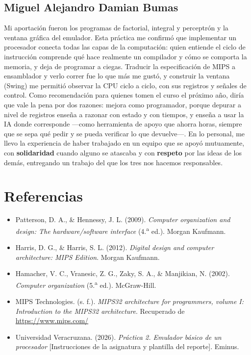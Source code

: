 \documentclass[11pt,letterpaper,oneside]{article}
\begin{document}
\subsection{Miguel Alejandro Damian Bumas}

Mi aportación fueron los programas de factorial, integral y perceptrón y la
ventana gráfica del emulador. Esta práctica me confirmó que implementar un
procesador conecta todas las capas de la computación: quien entiende el ciclo
de instrucción comprende qué hace realmente un compilador y cómo se comporta la
memoria, y deja de programar a ciegas. Traducir la especificación de MIPS a
ensamblador y verlo correr fue lo que más me gustó, y construir la ventana
(Swing) me permitió observar la CPU ciclo a ciclo, con sus registros y señales
de control. Como recomendación para quienes tomen el curso el próximo año, diría
que vale la pena por dos razones: mejora como programador, porque depurar a
nivel de registros enseña a razonar con estado y con tiempos, y enseña a usar
la IA donde corresponde ---como herramienta de apoyo que ahorra horas, siempre
que se sepa qué pedir y se pueda verificar lo que devuelve---. En lo personal,
me llevo la experiencia de haber trabajado en un equipo que se apoyó
mutuamente, con \textbf{solidaridad} cuando alguno se atascaba y con
\textbf{respeto} por las ideas de los demás, entregando un trabajo del que los
tres nos hacemos responsables.

\section{Referencias}

\begin{itemize}[leftmargin=1.5em,itemsep=4pt]
  \item Patterson, D. A., \& Hennessy, J. L. (2009). \emph{Computer organization
    and design: The hardware/software interface} (4.\textsuperscript{a} ed.).
    Morgan Kaufmann.
  \item Harris, D. G., \& Harris, S. L. (2012). \emph{Digital design and computer
    architecture: MIPS Edition}. Morgan Kaufmann.
  \item Hamacher, V. C., Vranesic, Z. G., Zaky, S. A., \& Manjikian, N. (2002).
    \emph{Computer organization} (5.\textsuperscript{a} ed.). McGraw-Hill.
  \item MIPS Technologies. (s. f.). \emph{MIPS32 architecture for programmers,
    volume I: Introduction to the MIPS32 architecture}. Recuperado de
    \url{https://www.mips.com/}
  \item Universidad Veracruzana. (2026). \emph{Práctica 2. Emulador básico de un
    procesador} [Instrucciones de la asignatura y plantilla del reporte]. Eminus.
\end{itemize}
\end{document}
